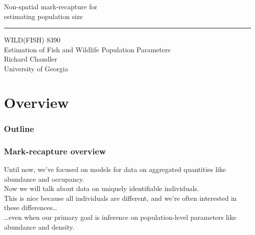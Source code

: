 \documentclass[color=usenames,dvipsnames]{beamer}\usepackage[]{graphicx}\usepackage[]{color}
\begin{document}
\begin{frame}[plain]
  \LARGE
  \centering
  {
    \LARGE %
    Non-spatial mark-recapture for \\ estimating
    population size%
  }
  {\color{default} \rule{\textwidth}{0.1pt} }
  \vfill
  \large
  WILD(FISH) 8390 \\
  Estimation of Fish and Wildlife Population Parameters \\
  \vfill
  \large
  Richard Chandler \\
  University of Georgia \\
\end{frame}






\section{Overview}



\begin{frame}[plain]
  \frametitle{Outline}
  \Large
\end{frame}



\begin{frame}
  \frametitle{Mark-recapture overview}
  Until now, we've focused on models for data on aggregated quantities
  like abundance and occupancy. \\ 
  \pause
  \vfill
  Now we will talk about data on uniquely identifiable individuals. \\
  \pause
  \vfill
  This is nice because all individuals are different, and we're often
  interested in these differences\dots \\
  \pause
  \vfill
  \dots even when our primary goal is
  inference on population-level parameters like abundance
  and density. \\
\end{frame}
\end{document}
